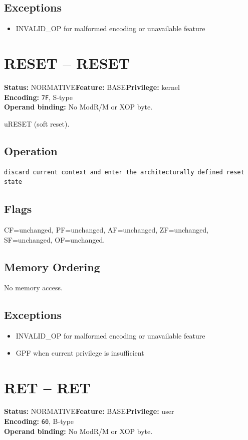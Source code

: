 \documentclass[10pt]{article}
\begin{document}
\subsection*{Exceptions}
\begin{itemize}
\item INVALID\_OP for malformed encoding or unavailable feature
\end{itemize}
\clearpage

\section{RESET -- RESET}
\textbf{Status:} NORMATIVE\quad \textbf{Feature:} BASE\quad \textbf{Privilege:} kernel\\
\textbf{Encoding:} \texttt{7F}, S-type\\
\textbf{Operand binding:} No ModR/M or XOP byte.

uRESET (soft reset).

\subsection*{Operation}
\begin{lstlisting}
discard current context and enter the architecturally defined reset state
\end{lstlisting}
\subsection*{Flags}
CF=unchanged, PF=unchanged, AF=unchanged, ZF=unchanged, SF=unchanged, OF=unchanged.
\subsection*{Memory Ordering}
No memory access.
\subsection*{Exceptions}
\begin{itemize}
\item INVALID\_OP for malformed encoding or unavailable feature
\item GPF when current privilege is insufficient
\end{itemize}
\clearpage

\section{RET -- RET}
\textbf{Status:} NORMATIVE\quad \textbf{Feature:} BASE\quad \textbf{Privilege:} user\\
\textbf{Encoding:} \texttt{60}, B-type\\
\textbf{Operand binding:} No ModR/M or XOP byte.
\end{document}
